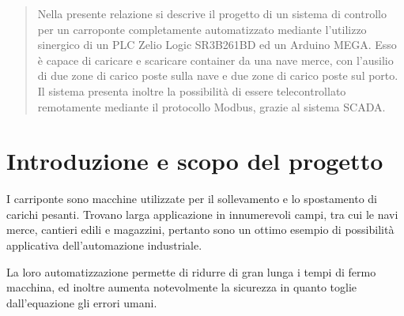 

\SetupMinted{}




\begin{abstract}
    Nella presente relazione si descrive il progetto di un sistema di controllo per un carroponte
    completamente automatizzato mediante l'utilizzo sinergico di un PLC Zelio Logic SR3B261BD ed
    un Arduino MEGA. Esso è capace di caricare e scaricare container da una nave merce, con
    l'ausilio di due zone di carico poste sulla nave e due zone di carico poste sul porto. Il
    sistema presenta inoltre la possibilità di essere telecontrollato remotamente mediante il
    protocollo Modbus, grazie al sistema SCADA.
    \cite{arm2015real}
\end{abstract}

\section{Introduzione e scopo del progetto}

I carriponte sono macchine utilizzate per il sollevamento e lo spostamento di carichi pesanti.
Trovano larga applicazione in innumerevoli campi, tra cui le navi merce, cantieri edili e magazzini,
pertanto sono un ottimo esempio di possibilità applicativa dell'automazione industriale.
\cite{ren2021design,li2015data}

La loro automatizzazione permette di ridurre di gran lunga i tempi di fermo macchina, ed inoltre
aumenta notevolmente la sicurezza in quanto toglie dall'equazione gli errori umani.
\cite{gupta2004simplified}


